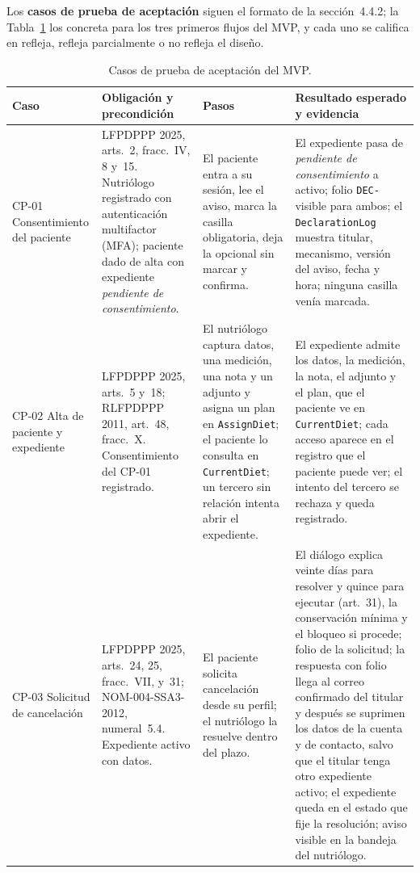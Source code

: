 \documentclass[12pt, a4paper]{article}
\begin{document}
Los \textbf{casos de prueba de aceptación} siguen el formato de la
sección~4.4.2; la Tabla~\ref{tab:casos-prueba} los concreta para los
tres primeros flujos del MVP, y cada uno se califica en refleja, refleja
parcialmente o no refleja el diseño.
 
\begin{table}[!htbp]
  \centering
  \caption{Casos de prueba de aceptación del MVP.}
  \label{tab:casos-prueba}
  \footnotesize
  \begin{tabularx}{\textwidth}{>{\raggedright\arraybackslash}p{2.1cm} X X X}
    \toprule
    \textbf{Caso} & \textbf{Obligación y precondición} & \textbf{Pasos} & \textbf{Resultado esperado y evidencia} \\
    \midrule
    CP-01 Consentimiento del paciente & LFPDPPP 2025, arts.~2, fracc.~IV, 8 y~15. Nutriólogo registrado con autenticación multifactor (MFA); paciente dado de alta con expediente \textit{pendiente de consentimiento}. & El paciente entra a su sesión, lee el aviso, marca la casilla obligatoria, deja la opcional sin marcar y confirma. & El expediente pasa de \textit{pendiente de consentimiento} a activo; folio \texttt{DEC-} visible para ambos; el \texttt{DeclarationLog} muestra titular, mecanismo, versión del aviso, fecha y hora; ninguna casilla venía marcada. \\
    CP-02 Alta de paciente y expediente & LFPDPPP 2025, arts.~5 y~18; RLFPDPPP 2011, art.~48, fracc.~X. Consentimiento del CP-01 registrado. & El nutriólogo captura datos, una medición, una nota y un adjunto y asigna un plan en \texttt{AssignDiet}; el paciente lo consulta en \texttt{CurrentDiet}; un tercero sin relación intenta abrir el expediente. & El expediente admite los datos, la medición, la nota, el adjunto y el plan, que el paciente ve en \texttt{CurrentDiet}; cada acceso aparece en el registro que el paciente puede ver; el intento del tercero se rechaza y queda registrado. \\
    CP-03 Solicitud de cancelación & LFPDPPP 2025, arts.~24, 25, fracc.~VII, y~31; NOM-004-SSA3-2012, numeral~5.4. Expediente activo con datos. & El paciente solicita cancelación desde su perfil; el nutriólogo la resuelve dentro del plazo. & El diálogo explica veinte días para resolver y quince para ejecutar (art.~31), la conservación mínima y el bloqueo si procede; folio de la solicitud; la respuesta con folio llega al correo confirmado del titular y después se suprimen los datos de la cuenta y de contacto, salvo que el titular tenga otro expediente activo; el expediente queda en el estado que fije la resolución; aviso visible en la bandeja del nutriólogo. \\
    \bottomrule
  \end{tabularx}
\end{table}
 
\end{document}
